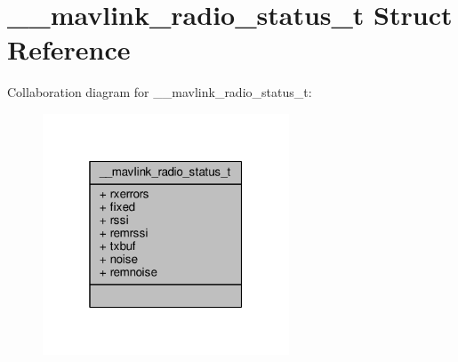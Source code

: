 \hypertarget{struct____mavlink__radio__status__t}{\section{\+\_\+\+\_\+mavlink\+\_\+radio\+\_\+status\+\_\+t Struct Reference}
\label{struct____mavlink__radio__status__t}
}


Collaboration diagram for \+\_\+\+\_\+mavlink\+\_\+radio\+\_\+status\+\_\+t\+:
\nopagebreak
\begin{figure}[H]
\begin{center}
\leavevmode
\includegraphics[width=208pt]{struct____mavlink__radio__status__t__coll__graph}
\end{center}
\end{figure}
